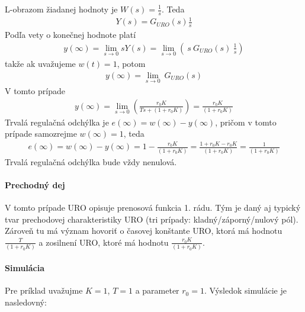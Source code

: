 \documentclass[a4paper, 10pt, ]{article}
\begin{document}
L-obrazom žiadanej hodnoty je $W(s) = \frac{1}{s}$. Teda
\begin{align}
    Y(s) = G_{URO}(s) \frac{1}{s}
\end{align}
Podľa vety o konečnej hodnote platí
\begin{align}
    y(\infty) = \lim_{s\to 0} s Y(s) = \lim_{s\to 0} \left( \ s \ G_{URO}(s) \ \frac{1}{s} \right)
\end{align}
takže ak uvažujeme $w(t) = 1$, potom
\begin{align}
    y(\infty) =  \lim_{s\to 0} \ G_{URO}(s)
\end{align}
V tomto prípade
\begin{align}
    y(\infty)
    =  \lim_{s\to 0} \left(  \frac{r_0 K}{Ts+ (1 + r_0 K)} \right)
    =  \frac{r_0 K}{(1 + r_0 K)}
\end{align}
Trvalá regulačná odchýlka je $e(\infty) = w(\infty) - y(\infty)$, pričom v tomto prípade samozrejme $ w(\infty) = 1$, teda
\begin{align}
    e(\infty)
    = w(\infty) - y(\infty)
    = 1 -  \frac{r_0 K}{(1 + r_0 K)}
    =\frac{1 + r_0 K - r_0 K}{(1 + r_0 K)}
    =\frac{1}{(1 + r_0 K)}
\end{align}
Trvalá regulačná odchýlka bude vždy nenulová.



\paragraph{Prechodný dej}
V tomto prípade URO opisuje prenosová funkcia 1. rádu. Tým je daný aj typický tvar prechodovej charakteristiky URO (tri prípady: kladný/záporný/nulový pól). Zároveň tu má význam hovoriť o časovej konštante URO, ktorá má hodnotu $\frac{T}{(1 + r_0 K)}$ a zosilnení URO, ktoré má hodnotu $\frac{r_0 K}{(1 + r_0 K)}$.



\paragraph{Simulácia}

Pre príklad uvažujme $K = 1$, $T = 1$ a parameter $r_0 = 1$. Výsledok simulácie je nasledovný:


\begin{center}



    \figcaption{}

\end{center}
\end{document}
